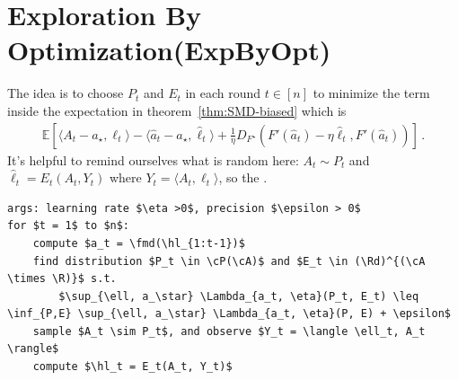 \documentclass{article}
\theoremstyle{plain}
\theoremstyle{definition}
\renewcommand{\epsilon}{\varepsilon}
\newcommand{\R}{\mathbb R}
\newcommand{\Rd}{\mathbb{R}^d}
\newcommand{\E}{\mathbb E}
\newcommand{\cA}{\mathcal A}
\newcommand{\cP}{\mathcal P}
\newcommand{\fmd}{\texttt{MD}}
\newcommand{\expbyopt}{\textsf{ExpByOpt}\xspace}
\newcommand{\hl}{\hat{\ell}\xspace}
\begin{document}
\section{Exploration By Optimization(\expbyopt)}
The idea is to choose $P_t$ and $E_t$ in each round $t \in [n]$
to minimize the term inside the expectation in theorem~\ref{thm:SMD-biased}
which is
\begin{align*}
    \E\left[
        \langle A_t - a_\star, \ell_t\rangle
        - \langle \hat{a}_t - a_\star, \hl_t\rangle
        + \frac{1}{\eta} D_{F^\star}(F'(\hat{a}_t) - \eta \hl_t, F'(\hat{a}_t))
        \right]\,.
\end{align*}
It's helpful to remind ourselves what is random here: $A_t \sim P_t$ and
$\hl_t = E_t(A_t, Y_t)$ where $Y_t = \langle A_t, \ell_t \rangle$,
so the .

\begin{algorithm}[h!]
    \begin{minipage}{12cm}
        \begin{mdframed}
            \begin{lstlisting}
args: learning rate $\eta >0$, precision $\epsilon > 0$
for $t = 1$ to $n$:
    compute $a_t = \fmd(\hl_{1:t-1})$
    find distribution $P_t \in \cP(\cA)$ and $E_t \in (\Rd)^{(\cA \times \R)}$ s.t.
        $\sup_{\ell, a_\star} \Lambda_{a_t, \eta}(P_t, E_t) \leq \inf_{P,E} \sup_{\ell, a_\star} \Lambda_{a_t, \eta}(P, E) + \epsilon$
    sample $A_t \sim P_t$, and observe $Y_t = \langle \ell_t, A_t \rangle$
    compute $\hl_t = E_t(A_t, Y_t)$
\end{lstlisting}
            \caption{\expbyopt}\label{alg:exp-by-opt}
        \end{mdframed}
    \end{minipage}
\end{algorithm}
\end{document}
